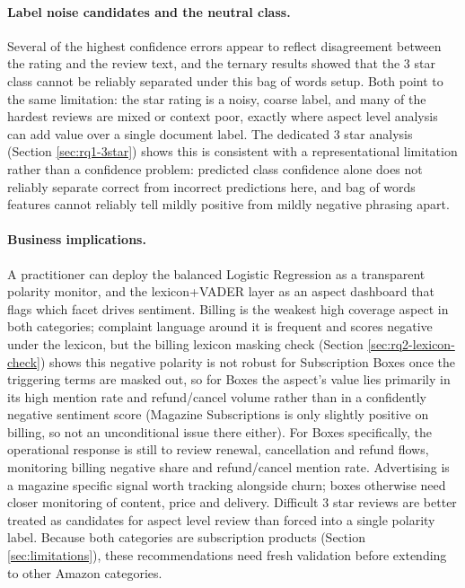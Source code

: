 \documentclass[11pt,a4paper,DIV=12]{scrartcl}
\begin{document}
\paragraph{Label noise candidates and the neutral class.}
Several of the highest confidence errors appear to reflect disagreement between
the rating and the review text, and the ternary results showed that the 3 star
class cannot be reliably separated under this bag of words setup. Both point to
the same limitation: the star rating is a noisy, coarse label, and many of the
hardest reviews are mixed or context poor, exactly where aspect level
analysis can add value over a single document label. The dedicated 3 star
analysis (Section \ref{sec:rq1-3star}) shows this is consistent with a
representational limitation rather than a confidence problem: predicted class
confidence alone does not reliably separate correct from incorrect
predictions here, and bag of words features cannot reliably tell
mildly positive from mildly negative phrasing apart.

\paragraph{Business implications.}
A practitioner can deploy the balanced Logistic Regression as a transparent
polarity monitor, and the lexicon+VADER layer as an aspect dashboard that
flags which facet drives sentiment. Billing is the weakest
high coverage aspect in both categories; complaint language around it is
frequent and scores negative under the lexicon, but the billing lexicon
masking check (Section \ref{sec:rq2-lexicon-check}) shows this negative
polarity is not robust for Subscription Boxes once the triggering
terms are masked out, so for Boxes the aspect's value lies primarily in its
high mention rate and refund/cancel volume rather than in a confidently
negative sentiment score (Magazine Subscriptions is only slightly positive on
billing, so not an unconditional issue there either). For Boxes specifically,
the operational response is still to review renewal, cancellation and refund
flows, monitoring billing negative share and refund/cancel mention rate.
Advertising is a
magazine specific signal worth tracking alongside churn; boxes otherwise need
closer monitoring of content, price and delivery. Difficult 3 star reviews are
better treated as candidates for aspect level review than forced into a single
polarity label. Because both categories are subscription products (Section
\ref{sec:limitations}), these recommendations need fresh validation before
extending to other Amazon categories.
\end{document}
